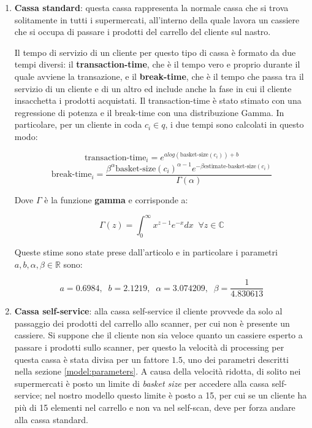 \begin{enumerate}
\item \textbf{Cassa standard}: questa cassa rappresenta la normale cassa che si trova solitamente in tutti i supermercati, all'interno della quale lavora un cassiere che si occupa di passare i prodotti del carrello del cliente sul nastro.
 
Il tempo di servizio di un cliente per questo tipo di cassa è formato da due tempi diversi: il \textbf{transaction-time}, che è il tempo vero e proprio durante il quale avviene la transazione, e il \textbf{break-time}, che è il tempo che passa tra il servizio di un cliente e di un altro ed include anche la fase in cui il cliente insacchetta i prodotti acquistati. Il transaction-time è stato stimato con una regressione di potenza e il break-time con una distribuzione Gamma. In particolare, per un cliente in coda $c_i \in q$, i due tempi sono calcolati in questo modo:

\begin{equation}\label{eq:transaction-time-standard}
\text{transaction-time}_i = e^{a log(\text{basket-size}(c_i)) + b}
\end{equation}
\begin{equation}\label{eq:break-time-standard}
\text{break-time}_i = \frac{\beta^{\alpha} \text{basket-size}(c_i)^{\alpha - 1} e^{- \beta \text{estimate-basket-size}(c_i)}}{\Gamma (\alpha)}
\end{equation}

Dove $\Gamma$ è la funzione \textbf{gamma} e corrisponde a:

\begin{equation}
\Gamma (z) = \int_{0}^{\infty} x^{z-1} e^{-x} dx \;\; \forall z \in \mathbb{C}
\end{equation}

Queste stime sono state prese dall'articolo \cite{article1} e in particolare i parametri $a,b,\alpha ,\beta \in \mathbb{R}$ sono:

\begin{equation}
a = 0.6984, \;\; b = 2.1219, \;\; \alpha = 3.074209, \;\; \beta = \frac{1}{4.830613}
\end{equation}

\item \textbf{Cassa self-service}: alla cassa self-service il cliente provvede da solo al passaggio dei prodotti del carrello allo scanner, per cui non è presente un cassiere. Si suppone che il cliente non sia veloce quanto un cassiere esperto a passare i prodotti sullo scanner, per questo la velocità di processing per questa cassa è stata divisa per un fattore $1.5$, uno dei parametri descritti nella sezione \ref{model:parameters}. A causa della velocità ridotta, di solito nei supermercati è posto un limite di \textit{basket size} per accedere alla cassa self-service; nel nostro modello questo limite è posto a 15, per cui se un cliente ha più di 15 elementi nel carrello e non va nel self-scan, deve per forza andare alla cassa standard.


\end{enumerate}
